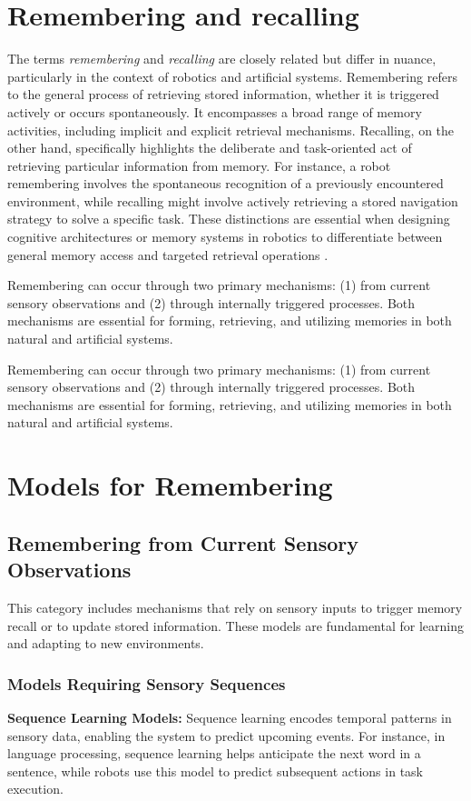 \section{Remembering and recalling}
    The terms \textit{remembering} and \textit{recalling} are closely related but differ in nuance, particularly in the context of robotics and artificial systems. Remembering refers to the general process of retrieving stored information, whether it is triggered actively or occurs spontaneously. It encompasses a broad range of memory activities, including implicit and explicit retrieval mechanisms. Recalling, on the other hand, specifically highlights the deliberate and task-oriented act of retrieving particular information from memory. For instance, a robot remembering involves the spontaneous recognition of a previously encountered environment, while recalling might involve actively retrieving a stored navigation strategy to solve a specific task. These distinctions are essential when designing cognitive architectures or memory systems in robotics to differentiate between general memory access and targeted retrieval operations .

    Remembering can occur through two primary mechanisms: (1) from current sensory observations and (2) through internally triggered processes. Both mechanisms are essential for forming, retrieving, and utilizing memories in both natural and artificial systems.

    Remembering can occur through two primary mechanisms: (1) from current sensory observations and (2) through internally triggered processes. Both mechanisms are essential for forming, retrieving, and utilizing memories in both natural and artificial systems.

\section{Models for Remembering}

    \subsection{Remembering from Current Sensory Observations}
    This category includes mechanisms that rely on sensory inputs to trigger memory recall or to update stored information. These models are fundamental for learning and adapting to new environments.

        \subsubsection{Models Requiring Sensory Sequences}
            \textbf{Sequence Learning Models:} Sequence learning encodes temporal patterns in sensory data, enabling the system to predict upcoming events. For instance, in language processing, sequence learning helps anticipate the next word in a sentence, while robots use this model to predict subsequent actions in task execution. 

